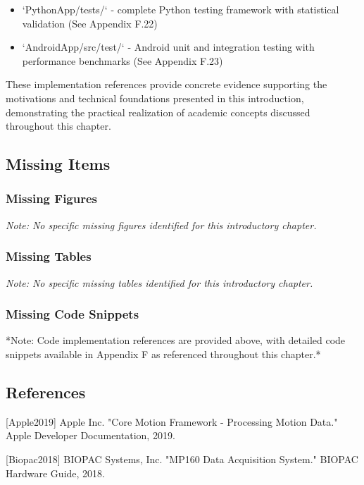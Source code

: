 \documentclass[11pt,a4paper]{article}
\begin{document}
\begin{itemize}
\item `PythonApp/tests/` - complete Python testing framework with statistical
validation (See Appendix F.22)
\item `AndroidApp/src/test/` - Android unit and integration testing with
performance benchmarks (See Appendix F.23)

\end{itemize}
These implementation references provide concrete evidence supporting the
motivations and technical foundations presented
in this introduction, demonstrating the practical realization of academic
concepts discussed throughout this chapter.

\subsection{Missing Items}

\subsubsection{Missing Figures}

\textit{Note: No specific missing figures identified for this introductory chapter.}

\subsubsection{Missing Tables}

\textit{Note: No specific missing tables identified for this introductory chapter.}

\subsubsection{Missing Code Snippets}

*Note: Code implementation references are provided above, with detailed code
snippets available in Appendix F as
referenced throughout this chapter.*

\subsection{References}

[Apple2019] Apple Inc. "Core Motion Framework - Processing Motion Data." Apple
Developer Documentation, 2019.

[Biopac2018] BIOPAC Systems, Inc. "MP160 Data Acquisition System." BIOPAC
Hardware Guide, 2018.
\end{document}
